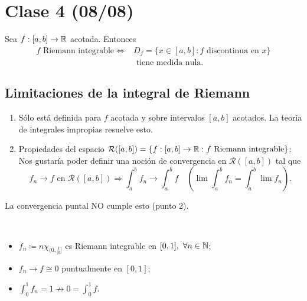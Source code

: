 
	\section{Clase 4 (08/08)}

	\begin{theorem}
		Sea $f:[a,b]\to\mathbb{R}$ acotada. Entonces
		\begin{align*}
			f \text{ Riemann integrable}\Longleftrightarrow & D_f=\{x\in[a,b]:f\text{ discontinua en } x\} \\ & \text{ tiene medida nula.}
		\end{align*}
	\end{theorem}

	\subsection{Limitaciones de la integral de Riemann}

	\begin{enumerate}
		\item Sólo está definida para $f$ acotada y sobre intervalos $[a,b]$ acotados. La teoría de integrales impropias resuelve esto.

		\item Propiedades del espacio $\mathcal{R}([a,b])=\{f:[a,b]\to\mathbb{R}:f\text{ Riemann integrable}\}$: Nos gustaría poder definir una noción de convergencia en $\mathcal{R}([a,b])$ tal que
		\[
		f_n\to f \text { en } \mathcal{R}([a,b]) \Rightarrow \int_{a}^{b} f_n\to \int_{a}^{b} f \quad \left( \lim \int_{a}^{b} f_n = \int_{a}^{b} \lim f_n \right).
		\]
	\end{enumerate}

	\begin{remark}
		La convergencia puntal NO cumple esto (punto 2).
	\end{remark}

	\begin{eg}[1]~
		\begin{itemize}
			\item $f_n \coloneq n \chi_{(0,\frac{1}{n}]}$ es Riemann integrable en $[0,1],\ \forall n \in \mathbb{N}$;

			\item $f_n \to f \cong 0$ puntualmente en $[0,1]$;

			\item $\int_{0}^{1} f_n = 1 \not\to 0 = \int_{0}^{1} f$.
		\end{itemize}
	\end{eg}

